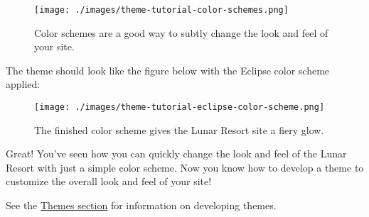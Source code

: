 \begin{enumerate}
  \begin{figure}
  \centering
  \texttt{[image: ./images/theme-tutorial-color-schemes.png]}
  \caption{Color schemes are a good way to subtly change the look and
  feel of your site.}
  \end{figure}

  The theme should look like the figure below with the Eclipse color
  scheme applied:

  \begin{figure}
  \centering
  \texttt{[image: ./images/theme-tutorial-eclipse-color-scheme.png]}
  \caption{The finished color scheme gives the Lunar Resort site a fiery
  glow.}
  \end{figure}
\end{enumerate}

Great! You've seen how you can quickly change the look and feel of the
Lunar Resort with just a simple color scheme. Now you know how to
develop a theme to customize the overall look and feel of your site!

See the
\href{/docs/7-2/frameworks/-/knowledge_base/f/themes-introduction}{Themes
section} for information on developing themes.
